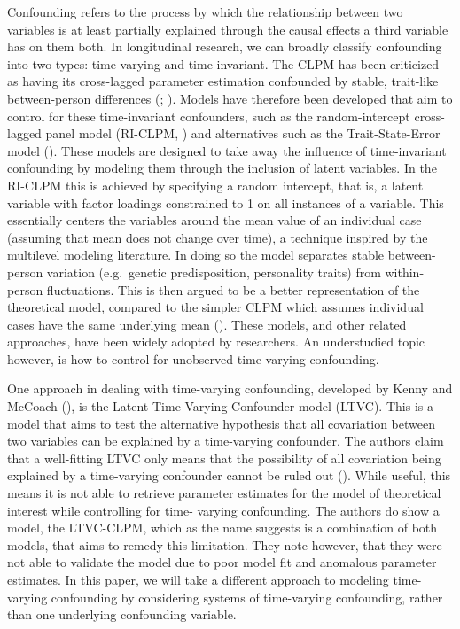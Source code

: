 \documentclass[
  man,
  floatsintext,
  longtable,
  nolmodern,
  notxfonts,
  notimes,
  colorlinks=true,linkcolor=blue,citecolor=blue,urlcolor=blue]{apa7}
\begin{document}
Confounding refers to the process by which the relationship between two
variables is at least partially explained through the causal effects a
third variable has on them both. In longitudinal research, we can
broadly classify confounding into two types: time-varying and
time-invariant. The CLPM has been criticized as having its cross-lagged
parameter estimation confounded by stable, trait-like between-person
differences (; ). Models have therefore been developed that aim to control for
these time-invariant confounders, such as the random-intercept
cross-lagged panel model (RI-CLPM,
) and alternatives such as the Trait-State-Error model
(). These models are designed to take away the influence of
time-invariant confounding by modeling them through the inclusion of
latent variables. In the RI-CLPM this is achieved by specifying a random
intercept, that is, a latent variable with factor loadings constrained
to 1 on all instances of a variable. This essentially centers the
variables around the mean value of an individual case (assuming that
mean does not change over time), a technique inspired by the multilevel
modeling literature. In doing so the model separates stable
between-person variation (e.g.~genetic predisposition, personality
traits) from within-person fluctuations. This is then argued to be a
better representation of the theoretical model, compared to the simpler
CLPM which assumes individual cases have the same underlying mean
(). These
models, and other related approaches, have been widely adopted by
researchers. An understudied topic however, is how to control for
unobserved time-varying confounding.

One approach in dealing with time-varying confounding, developed by
Kenny and McCoach (), is
the Latent Time-Varying Confounder model (LTVC). This is a model that
aims to test the alternative hypothesis that all covariation between two
variables can be explained by a time-varying confounder. The authors
claim that a well-fitting LTVC only means that the possibility of all
covariation being explained by a time-varying confounder cannot be ruled
out ().
While useful, this means it is not able to retrieve parameter estimates
for the model of theoretical interest while controlling for time-
varying confounding. The authors do show a model, the LTVC-CLPM, which
as the name suggests is a combination of both models, that aims to
remedy this limitation. They note however, that they were not able to
validate the model due to poor model fit and anomalous parameter
estimates. In this paper, we will take a different approach to modeling
time- varying confounding by considering systems of time-varying
confounding, rather than one underlying confounding variable.
\end{document}
